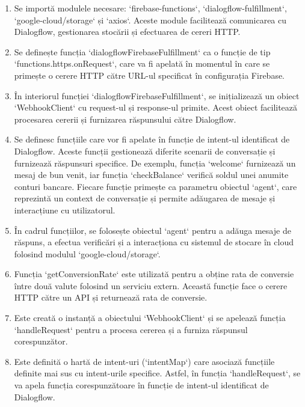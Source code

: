 \begin{enumerate}
    \item Se importă modulele necesare: `firebase-functions`, `dialogflow-fulfillment`, `google-cloud/storage` și `axios`. Aceste module facilitează comunicarea cu Dialogflow, gestionarea stocării și efectuarea de cereri HTTP.

    \item Se definește funcția `dialogflowFirebaseFulfillment` ca o funcție de tip `functions.https.onRequest`, care va fi apelată în momentul în care se primește o cerere HTTP către URL-ul specificat în configurația Firebase.

    \item În interiorul funcției `dialogflowFirebaseFulfillment`, se inițializează un obiect `WebhookClient` cu request-ul și response-ul primite. Acest obiect facilitează procesarea cererii și furnizarea răspunsului către Dialogflow.

    \item Se definesc funcțiile care vor fi apelate în funcție de intent-ul identificat de Dialogflow. Aceste funcții gestionează diferite scenarii de conversație și furnizează răspunsuri specifice. De exemplu, funcția `welcome` furnizează un mesaj de bun venit, iar funcția `checkBalance` verifică soldul unei anumite conturi bancare. Fiecare funcție primește ca parametru obiectul `agent`, care reprezintă un context de conversație și permite adăugarea de mesaje și interacțiune cu utilizatorul.

    \item În cadrul funcțiilor, se folosește obiectul `agent` pentru a adăuga mesaje de răspuns, a efectua verificări și a interacționa cu sistemul de stocare în cloud folosind modulul `google-cloud/storage`.

    \item Funcția `getConversionRate` este utilizată pentru a obține rata de conversie între două valute folosind un serviciu extern. Această funcție face o cerere HTTP către un API și returnează rata de conversie.

    \item Este creată o instanță a obiectului `WebhookClient` și se apelează funcția `handleRequest` pentru a procesa cererea și a furniza răspunsul corespunzător.

    \item Este definită o hartă de intent-uri (`intentMap`) care asociază funcțiile definite mai sus cu intent-urile specifice. Astfel, în funcția `handleRequest`, se va apela funcția corespunzătoare în funcție de intent-ul identificat de Dialogflow.
\end{enumerate}

